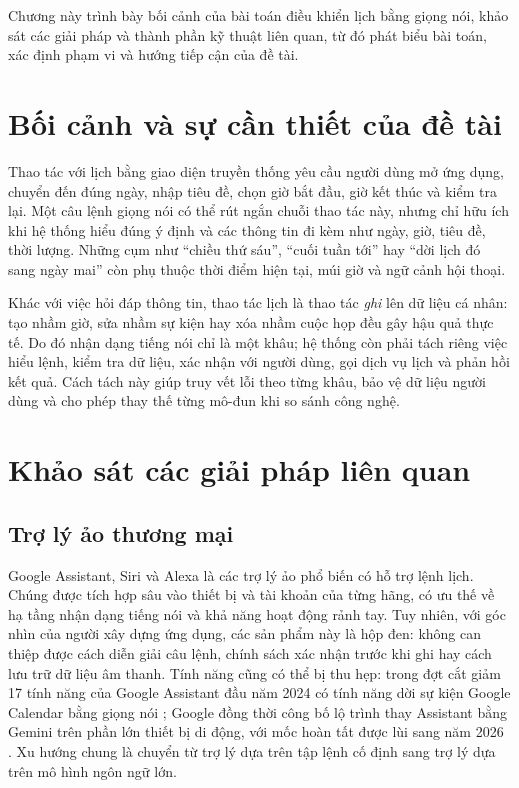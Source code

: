 \label{ch:intro}

Chương này trình bày bối cảnh của bài toán điều khiển lịch bằng giọng nói, khảo sát các giải pháp và thành phần kỹ thuật liên quan, từ đó phát biểu bài toán, xác định phạm vi và hướng tiếp cận của đề tài.

\section{Bối cảnh và sự cần thiết của đề tài}
Thao tác với lịch bằng giao diện truyền thống yêu cầu người dùng mở ứng dụng, chuyển đến đúng ngày, nhập tiêu đề, chọn giờ bắt đầu, giờ kết thúc và kiểm tra lại. Một câu lệnh giọng nói có thể rút ngắn chuỗi thao tác này, nhưng chỉ hữu ích khi hệ thống hiểu đúng ý định và các thông tin đi kèm như ngày, giờ, tiêu đề, thời lượng. Những cụm như “chiều thứ sáu”, “cuối tuần tới” hay “dời lịch đó sang ngày mai” còn phụ thuộc thời điểm hiện tại, múi giờ và ngữ cảnh hội thoại.

Khác với việc hỏi đáp thông tin, thao tác lịch là thao tác \textit{ghi} lên dữ liệu cá nhân: tạo nhầm giờ, sửa nhầm sự kiện hay xóa nhầm cuộc họp đều gây hậu quả thực tế. Do đó nhận dạng tiếng nói chỉ là một khâu; hệ thống còn phải tách riêng việc hiểu lệnh, kiểm tra dữ liệu, xác nhận với người dùng, gọi dịch vụ lịch và phản hồi kết quả. Cách tách này giúp truy vết lỗi theo từng khâu, bảo vệ dữ liệu người dùng và cho phép thay thế từng mô-đun khi so sánh công nghệ.

\section{Khảo sát các giải pháp liên quan}
\subsection{Trợ lý ảo thương mại}
Google Assistant, Siri và Alexa là các trợ lý ảo phổ biến có hỗ trợ lệnh lịch. Chúng được tích hợp sâu vào thiết bị và tài khoản của từng hãng, có ưu thế về hạ tầng nhận dạng tiếng nói và khả năng hoạt động rảnh tay. Tuy nhiên, với góc nhìn của người xây dựng ứng dụng, các sản phẩm này là hộp đen: không can thiệp được cách diễn giải câu lệnh, chính sách xác nhận trước khi ghi hay cách lưu trữ dữ liệu âm thanh. Tính năng cũng có thể bị thu hẹp: trong đợt cắt giảm 17 tính năng của Google Assistant đầu năm 2024 có tính năng dời sự kiện Google Calendar bằng giọng nói \cite{tcassistant}; Google đồng thời công bố lộ trình thay Assistant bằng Gemini trên phần lớn thiết bị di động, với mốc hoàn tất được lùi sang năm 2026 \cite{ninetofive}. Xu hướng chung là chuyển từ trợ lý dựa trên tập lệnh cố định sang trợ lý dựa trên mô hình ngôn ngữ lớn.

